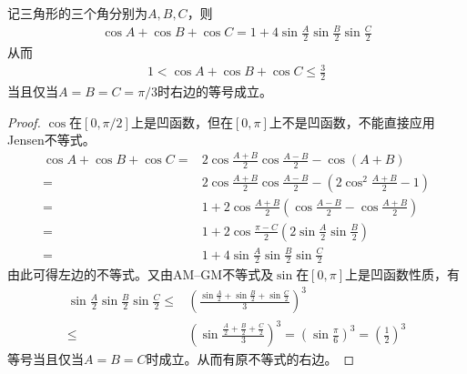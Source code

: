 \begin{theorem}\label{th:cosA+cosB+cosC<=3/2}
  记三角形的三个角分别为$A,B,C$，则
  \begin{align*}
    \cos A +\cos B + \cos C = 1 + 4\sin\frac A2 \sin\frac B2 \sin\frac C2
  \end{align*}
  从而
  \begin{align*}
    1 < \cos A +\cos B + \cos C \le \frac32
  \end{align*}
  当且仅当$A=B=C=\pi/3$时右边的等号成立。
\end{theorem}
\begin{proof}$\cos$在$[0,\pi/2]$上是凹函数，但在$[0,\pi]$上不是凹函数，不能直接应用Jensen不等式。
  \begin{align*}
    \cos A +\cos B + \cos C ={}& 2\cos\frac{A+B}{2}\cos\frac{A-B}{2} - \cos(A+B)\\
    ={}& 2\cos\frac{A+B}{2}\cos\frac{A-B}{2} - \left(2\cos^2\frac{A+B}2 - 1\right)\\
    ={}& 1 + 2\cos\frac{A+B}{2}\left(\cos\frac{A-B}{2} - \cos\frac{A+B}2\right)\\
    ={}& 1 + 2\cos\frac{\pi-C}{2} \left( 2\sin \frac A2\sin\frac B2 \right)\\
    ={}& 1 + 4\sin\frac A2\sin\frac B2\sin\frac C2
  \end{align*}
  由此可得左边的不等式。又由AM--GM不等式及$\sin$在$[0,\pi]$上是凹函数性质，有
  \begin{align*}
    \sin\frac A2\sin\frac B2\sin\frac C2 \le{}&
    \left( \frac{\sin\frac A2 + \sin\frac B2 + \sin\frac C2}{3} \right)^3\\
    \le{}& \left( \sin\frac{\frac A2 + \frac B2 + \frac C2}{3} \right)^3
      = \left( \sin\frac\pi6 \right)^3 = \left(\frac12\right)^3    
  \end{align*}
  等号当且仅当$A=B=C$时成立。从而有原不等式的右边。
\end{proof}

